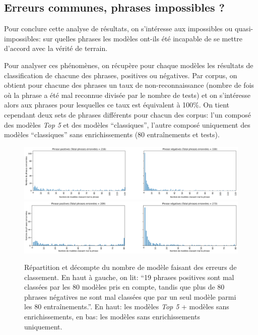 \subsection{Erreurs communes, phrases impossibles ?}

Pour conclure cette analyse de résultats, on s'intéresse aux impossibles ou quasi-impossibles: sur quelles phrases les modèles ont-ils été incapable de se mettre d'accord avec la vérité de terrain. 

Pour analyser ces phénomènes, on récupère pour chaque modèles les résultats de classification de chacune des phrases, positives ou négatives. Par corpus, on obtient pour chacune des phrases un taux de non-reconnaissance (nombre de fois où la phrase a été mal reconnue divisée par le nombre de tests) et on s'intéresse alors aux phrases pour lesquelles ce taux est équivalent à 100\%. On tient cependant deux sets de phrases différents pour chacun des corpus: l'un composé des modèles \textit{Top 5} et des modèles ``classiques'', l'autre composé uniquement des modèles ``classiques'' sans enrichissements (80 entraînements et tests).

\begin{figure}[ht]
    \centering
    \includegraphics[width=\linewidth]{figures/commonErrors.png}
    \includegraphics[width=\linewidth]{figures/commonErrorsNotEnriched.png}
    \caption{Répartition et décompte du nombre de modèle faisant des erreurs de classement. En haut à gauche, on lit: ``19 phrases positives sont mal classées par les 80 modèles pris en compte, tandis que plus de 80 phrases négatives ne sont mal classées que par un seul modèle parmi les 80 entraînements.''. En haut: les modèles \textit{Top 5} + modèles sans enrichissements, en bas: les modèles sans enrichissements uniquement.}
    \label{fig:chap4:commonErrors}
\end{figure}

